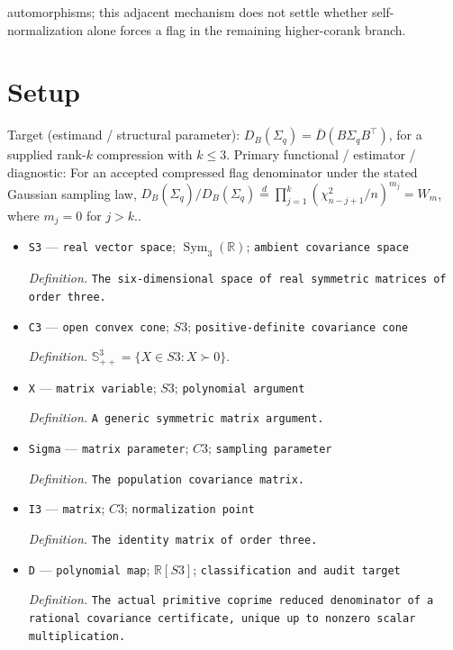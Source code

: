 \documentclass{article}
\begin{document}
automorphisms; this adjacent mechanism does not settle whether self-normalization alone forces a flag in the remaining higher-corank branch.

\section{Setup}

Target (estimand / structural parameter): \(D_B(\Sigma_q)=\bar D(B\Sigma_qB^{\top})\), for a supplied rank-\(k\) compression with \(k\leq3\).
Primary functional / estimator / diagnostic: For an accepted compressed flag denominator under the stated Gaussian sampling law, \(D_B(\widehat\Sigma_q)/D_B(\Sigma_q)\stackrel{d}{=}\prod_{j=1}^{k}(\chi^2_{n-j+1}/n)^{m_j}=W_m\), where \(m_j=0\) for \(j>k\)..
\begin{itemize}
  \item \texttt{S3} --- \texttt{real vector space}; \(\operatorname{Sym}_{3}(\mathbb R)\); \texttt{ambient covariance space}
  \par\smallskip\noindent\emph{Definition.} \texttt{The six-\allowbreak{}dimensional space of real symmetric matrices of order three.}
  \item \texttt{C3} --- \texttt{open convex cone}; \(S3\); \texttt{positive-\allowbreak{}definite covariance cone}
  \par\smallskip\noindent\emph{Definition.} \(\mathbb S_{++}^{3}=\{X\in S3:X\succ0\}\).
  \item \texttt{X} --- \texttt{matrix variable}; \(S3\); \texttt{polynomial argument}
  \par\smallskip\noindent\emph{Definition.} \texttt{A generic symmetric matrix argument.}
  \item \texttt{Sigma} --- \texttt{matrix parameter}; \(C3\); \texttt{sampling parameter}
  \par\smallskip\noindent\emph{Definition.} \texttt{The population covariance matrix.}
  \item \texttt{I3} --- \texttt{matrix}; \(C3\); \texttt{normalization point}
  \par\smallskip\noindent\emph{Definition.} \texttt{The identity matrix of order three.}
  \item \texttt{D} --- \texttt{polynomial map}; \(\mathbb R[S3]\); \texttt{classification and audit target}
  \par\smallskip\noindent\emph{Definition.} \texttt{The actual primitive coprime reduced denominator of a rational covariance certificate,\allowbreak{} unique up to nonzero scalar multiplication.}

\end{itemize}
\end{document}
